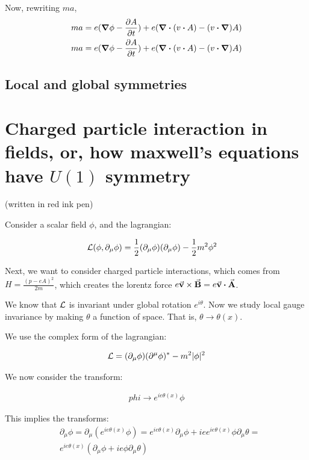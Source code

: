 Now, rewriting $ma$,
\begin{align*}
ma &= e (\grad \phi - \pdv{A}{t}) + e (\div (v \vdot A) - (v \vdot \grad) A) \\
ma &= e (\grad \phi - \pdv{A}{t}) + e (\div (v \vdot A) - (v \vdot \grad) A)
\end{align*}

\section{Local and global symmetries}

\chapter{Charged particle interaction in fields, or, how maxwell's equations have $U(1)$ symmetry}
(written in red ink pen)

Consider a scalar field $\phi$, and the lagrangian:

\begin{align*}
    &\mathcal{L}(\phi, \partial_\mu \phi) = \frac{1}{2} (\partial_\mu \phi) (\partial_\mu \phi) - \frac{1}{2} m^2 \phi^2
\end{align*}

Next, we want to consider charged particle interactions, which comes from
$H = \frac{(p - eA)^2}{2m}$, which creates the lorentz force $e \va v \times \va B = e \va v \vdot \va A$.

We know that $\mathcal{L}$ is invariant under global rotation $e^{i \theta}$. Now we
study local gauge invariance by making $\theta$ a function of space. That is,
$\theta \to \theta(x)$.

We use the complex form of the lagrangian:

\begin{align*}
    \mathcal{L} = (\partial_\mu \phi) (\partial^\mu \phi)^* - m^2|\phi|^2
\end{align*}

We now consider the transform:

\begin{align*}
    phi \to e^{i e \theta(x)} \phi
\end{align*}

This implies the transforms:
\begin{align*}
    &\partial_\mu \phi =
    \partial_\mu (e^{i e \theta(x)} \phi) =
    e^{i e \theta(x)} \partial_\mu \phi + i e e^{i e \theta(x)} \phi \partial_\mu \theta = \\
    &e^{i e \theta(x)}(\partial_\mu \phi + i e \phi \partial_\mu \theta)
\end{align*}

